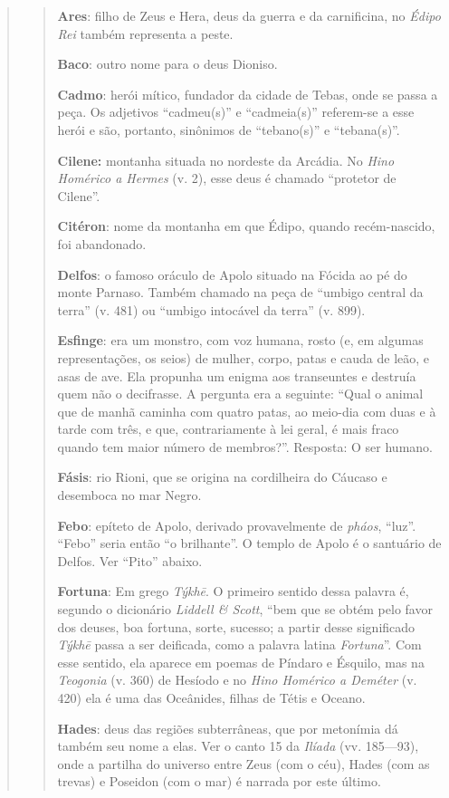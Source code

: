\begin{verse}
\begin{verse}
\textbf{Ares}: filho de Zeus e Hera, deus da guerra e da carnificina,
no \emph{Édipo Rei} também representa a peste.

\textbf{Baco}: outro nome para o deus Dioniso.

\textbf{Cadmo}: herói mítico, fundador da cidade de Tebas, onde se
passa a peça. Os adjetivos ``cadmeu(s)'' e ``cadmeia(s)'' referem-se a
esse herói e são, portanto, sinônimos de ``tebano(s)'' e ``tebana(s)''.

\textbf{Cilene:} montanha situada no nordeste da Arcádia. No
\emph{Hino Homérico a Hermes} (v. 2), esse deus é chamado ``protetor de
Cilene''.

\textbf{Citéron}: nome da montanha em que Édipo, quando
recém-nascido, foi abandonado.

\textbf{Delfos}: o famoso oráculo de Apolo situado na Fócida ao pé do
monte Parnaso. Também chamado na peça de ``umbigo central da terra'' (v.
481) ou ``umbigo intocável da terra'' (v. 899).

\textbf{Esfinge}: era um monstro, com voz humana, rosto (e, em
algumas representações, os seios) de mulher, corpo, patas e cauda de
leão, e asas de ave. Ela propunha um enigma aos transeuntes e destruía
quem não o decifrasse. A pergunta era a seguinte: ``Qual o animal que de
manhã caminha com quatro patas, ao meio-dia com duas e à tarde com três,
e que, contrariamente à lei geral, é mais fraco quando tem maior número
de membros?''. Resposta: O ser humano.

\textbf{Fásis}: rio Rioni, que se origina na cordilheira do Cáucaso
e desemboca no mar Negro.

\textbf{Febo}: epíteto de Apolo, derivado provavelmente de
\emph{pháos}, ``luz''. ``Febo'' seria então ``o brilhante''. O templo de
Apolo é o santuário de Delfos. Ver ``Pito'' abaixo.

\textbf{Fortuna}: Em grego \emph{Týkhē}. O primeiro sentido dessa
palavra é, segundo o dicionário \emph{Liddell \& Scott}, ``bem que se
obtém pelo favor dos deuses, boa fortuna, sorte, sucesso; a partir desse
significado \emph{Týkhē} passa a ser deificada, como a palavra latina
\emph{Fortuna}''. Com esse sentido, ela aparece em poemas de Píndaro e
Ésquilo, mas na \emph{Teogonia} (v. 360) de Hesíodo e no \emph{Hino
Homérico a Deméter} (v. 420) ela é uma das Oceânides, filhas de Tétis e
Oceano.

\textbf{Hades}: deus das regiões subterrâneas, que por metonímia dá
também seu nome a elas. Ver o canto 15 da \emph{Ilíada} (vv. 185---93),
onde a partilha do universo entre Zeus (com o céu), Hades (com as
trevas) e Poseidon (com o mar) é narrada por este último.


\end{verse}
\end{verse}
